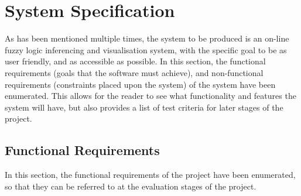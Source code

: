 \section{System Specification}
\label{sec:spec}
As has been mentioned multiple times, the system to be produced is an on-line fuzzy logic inferencing and visualisation system, with the specific goal to be as user friendly, and as accessible as possible. In this section, the functional requirements (goals that the software must achieve), and non-functional requirements (constraints placed upon the system) of the system have been enumerated. This allows for the reader to see what functionality and features the system will have, but also provides a list of test criteria for later stages of the project.

\subsection{Functional Requirements}
\label{sec:funcs}

In this section, the functional requirements of the project have been enumerated, so that they can be referred to at the evaluation stages of the project.


